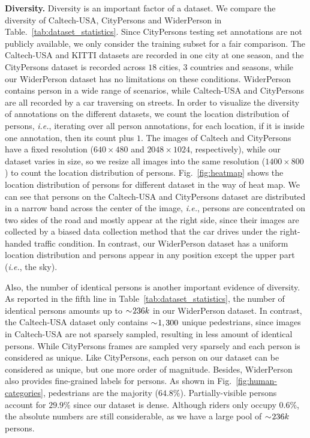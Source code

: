\documentclass[journal]{IEEEtran}
\def\ie{{\em i.e.}}
\begin{document}
{\flushleft \textbf{Diversity. }}
Diversity is an important factor of a dataset. We compare the diversity of Caltech-USA, CityPersons and WiderPerson in Table.~\ref{tab:dataset_statistics}. Since CityPersons testing set annotations are not publicly available, we only consider the training subset for a fair comparison. The Caltech-USA and KITTI datasets are recorded in one city at one season, and the CityPersons dataset is recorded across $18$ cities, $3$ countries and seasons, while our WiderPerson dataset has no limitations on these conditions. WiderPerson contains person in a wide range of scenarios, while Caltech-USA and CityPersons are all recorded by a car traversing on streets. In order to visualize the diversity of annotations on the different datasets, we count the location distribution of persons, \ie, iterating over all person annotations, for each location, if it is inside one annotation, then its count plus $1$. The images of Caltech and CityPersons have a fixed resolution ($640\times480$ and $2048\times1024$, respectively), while our dataset varies in size, so we resize all images into the same resolution ($1400\times800$) to count the location distribution of persons. Fig.~\ref{fig:heatmap} shows the location distribution of persons for different dataset in the way of heat map. We can see that persons on the Caltech-USA and CityPersons dataset are distributed in a narrow band across the center of the image, \ie, persons are concentrated on two sides of the road and mostly appear at the right side, since their images are collected by a biased data collection method that the car drives under the right-handed traffic condition. In contrast, our WiderPerson dataset has a uniform location distribution and persons appear in any position except the upper part (\ie, the sky).

Also, the number of identical persons is another important evidence of diversity. As reported in the fifth line in Table~\ref{tab:dataset_statistics}, the number of identical persons amounts up to $\sim\negmedspace 236k$ in our WiderPerson dataset. In contrast, the Caltech-USA dataset only contains $\sim\negmedspace 1,300$ unique pedestrians, since images in Caltech-USA are not sparsely sampled, resulting in less amount of identical persons. While CityPersons frames are sampled very sparsely and each person is considered as unique. Like CityPersons, each person on our dataset can be considered as unique, but one more order of magnitude. Besides, WiderPerson also provides fine-grained labels for persons. As shown in Fig.~\ref{fig:human-categories}, pedestrians are the majority ($64.8\%$). Partially-visible persons account for $29.9\%$ since our dataset is dense. Although riders only occupy $0.6\%$, the absolute numbers are still considerable, as we have a large pool of $\sim\negmedspace 236k$ persons.
\end{document}
